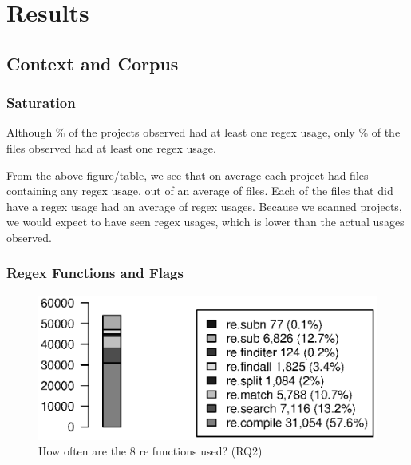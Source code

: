 \section{Results}

\subsection{Context and Corpus}

\subsubsection{Saturation}Although \% of the projects observed had at least one regex usage, only \% of the files observed had at least one regex usage.

%

From the above figure/table, we see that on average each project had  files containing any regex usage, out of an average of  files.  Each of the files that did have a regex usage had an average of  regex usages.  Because we scanned  projects, we would expect to have seen  regex usages, which is lower than the actual  usages observed.

\subsubsection{Regex Functions and Flags}

\begin{figure}[tb]
\centering
\includegraphics[width=\columnwidth]{../analysis_output/partFunctions.eps}
\caption{How often are the 8 re functions used? (RQ2)}
\label{fig:partFunctions}
\end{figure}

